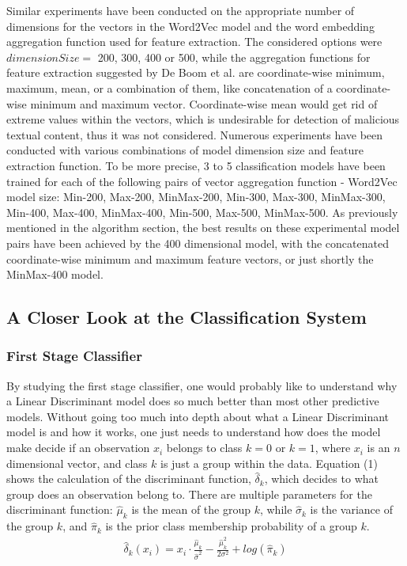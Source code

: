 \documentclass[11pt]{article}
\begin{document}
Similar experiments have been conducted on the appropriate number of dimensions for the vectors in the Word2Vec model and the word embedding aggregation function used for feature extraction. The considered options were $dimensionSize =$ 200, 300, 400 or 500, while the aggregation functions for feature extraction suggested by De Boom et al. are coordinate-wise minimum, maximum, mean, or a combination of them, like concatenation of a coordinate-wise minimum and maximum vector. Coordinate-wise mean would get rid of extreme values within the vectors, which is undesirable for detection of malicious textual content, thus it was not considered. Numerous experiments have been conducted with various combinations of model dimension size and feature extraction function. To be more precise, 3 to 5 classification models have been trained for each of the following pairs of vector aggregation function - Word2Vec model size: Min-200, Max-200, MinMax-200, Min-300, Max-300, MinMax-300, Min-400, Max-400, MinMax-400, Min-500, Max-500, MinMax-500. As previously mentioned in the algorithm section, the best results on these experimental model pairs have been achieved by the 400 dimensional model, with the concatenated coordinate-wise minimum and maximum feature vectors, or just shortly the MinMax-400 model.

\subsection{A Closer Look at the Classification System}
\subsubsection{First Stage Classifier}
By studying the first stage classifier, one would probably like to understand why a Linear Discriminant model does so much better than most other predictive models. Without going too much into depth about what a Linear Discriminant model is and how it works, one just needs to understand how does the model make decide if an observation $x_i$ belongs to class $k=0 $ or $k=1$, where $x_i$ is an $n$ dimensional vector, and class $k$ is just a group within the data. Equation (1) \cite{tibshirani2013introduction} shows the calculation of the discriminant function, $\hat{\delta}_{k}$, which decides to what group does an observation belong to. There are multiple parameters for the discriminant function: $\hat{\mu }_{k}$ is the mean of the group $k$, while $\hat{\sigma}_{k}$ is the variance of the group $k$, and $\hat{\pi}_{k}$ is the prior class membership probability of a group $k$.
\begin{align}
	{{\hat{\delta }}}_{{k}}\left({x_i}\right)=x_i \cdot \frac {{{\hat{\mu }}}_{{k}}}{{{\hat{\sigma }}}^{{2}}}-\frac {{{\hat{\mu}}}_{{k}}^{{2}}}{2{\sigma }^{{2}}}+{log{\left({{{\hat{\pi }}}_{{k}}}\right)}} 
\end{align}
\end{document}
